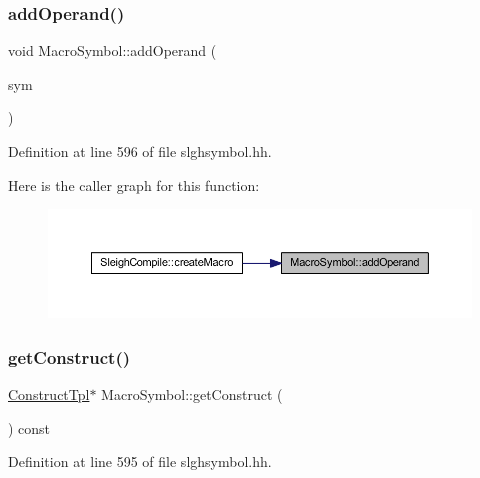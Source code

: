 \subsubsection{\texorpdfstring{addOperand()}{addOperand()}}
{\footnotesize\ttfamily void Macro\+Symbol\+::add\+Operand (\begin{DoxyParamCaption}\item[{\mbox{\hyperlink{class_operand_symbol}{Operand\+Symbol}} $\ast$}]{sym }\end{DoxyParamCaption})\hspace{0.3cm}{\ttfamily [inline]}}



Definition at line 596 of file slghsymbol.\+hh.

Here is the caller graph for this function\+:
\nopagebreak
\begin{figure}[H]
\begin{center}
\leavevmode
\includegraphics[width=350pt]{class_macro_symbol_aeb8d11b7c982396faac11ebbc9654941_icgraph}
\end{center}
\end{figure}
\mbox{\label{class_macro_symbol_aa1eba759ff6d0aa3a24709838847a7e3}} 
\subsubsection{\texorpdfstring{getConstruct()}{getConstruct()}}
{\footnotesize\ttfamily \mbox{\hyperlink{class_construct_tpl}{Construct\+Tpl}}$\ast$ Macro\+Symbol\+::get\+Construct (\begin{DoxyParamCaption}\item[{void}]{ }\end{DoxyParamCaption}) const\hspace{0.3cm}{\ttfamily [inline]}}



Definition at line 595 of file slghsymbol.\+hh.

\mbox{\label{class_macro_symbol_ad4ecc16c5e76789e19dd9757f6167e98}} 
